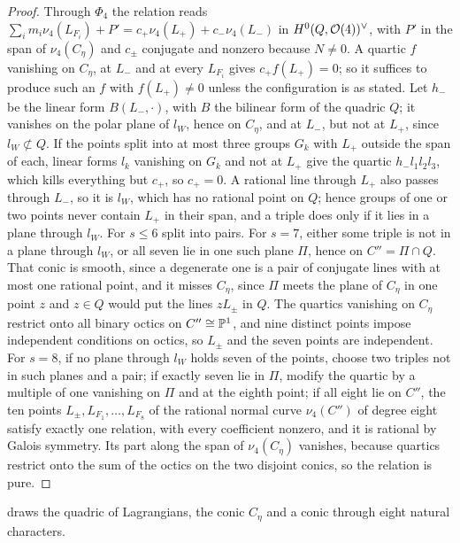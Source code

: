 \begin{proof}
Through $\Phi_{4}$ the relation reads
$\sum_{i}m_{i}\nu_{4}(L_{F_{i}})+P'=c_{+}\nu_{4}(L_{+})+c_{-}\nu_{4}(L_{-})$ in
$H^{0}(Q,\mathcal{O}(4))^{\vee}$, with $P'$ in the span of $\nu_{4}(C_{\eta})$ and
$c_{\pm}$ conjugate and nonzero because $N\ne0$. A quartic $f$ vanishing on
$C_{\eta}$, at $L_{-}$ and at every $L_{F_{i}}$ gives $c_{+}f(L_{+})=0$; so it
suffices to produce such an $f$ with $f(L_{+})\ne0$ unless the configuration
is as stated. Let $h_{-}$ be the linear form $B(L_{-},\cdot)$, with $B$ the
bilinear form of the quadric $Q$; it vanishes on the polar plane of $l_{W}$,
hence on $C_{\eta}$, and at $L_{-}$, but not at $L_{+}$, since
$l_{W}\not\subset Q$. If the points split into at most three groups
$G_{k}$ with $L_{+}$ outside the span of each, linear forms $l_{k}$ vanishing
on $G_{k}$ and not at $L_{+}$ give the quartic $h_{-}l_{1}l_{2}l_{3}$, which
kills everything but $c_{+}$, so $c_{+}=0$. A rational line through $L_{+}$
also passes through $L_{-}$, so it is $l_{W}$, which has no rational point on
$Q$; hence groups of one or two points
never contain $L_{+}$ in their span, and a triple does only if it lies in a
plane through $l_{W}$. For $s\le6$ split into pairs. For $s=7$, either some
triple is not in a plane through $l_{W}$, or all seven lie in one such plane
$\Pi$, hence on $C''=\Pi\cap Q$. That conic is smooth, since a degenerate one
is a pair of conjugate lines with at most one rational point, and it misses
$C_{\eta}$, since $\Pi$ meets the plane of $C_{\eta}$ in one point $z$ and
$z\in Q$ would put the lines $zL_{\pm}$ in $Q$. The quartics vanishing on
$C_{\eta}$ restrict onto all binary octics on $C''\cong\mathbb{P}^{1}$, and nine
distinct points impose independent conditions on octics, so $L_{\pm}$ and the
seven points are independent. For $s=8$, if no plane through $l_{W}$ holds
seven of the points, choose two triples not in such planes and a pair; if
exactly seven lie in $\Pi$, modify the quartic by a multiple of one vanishing
on $\Pi$ and at the eighth point; if all eight lie on $C''$, the ten points
$L_{\pm},L_{F_{1}},\dots,L_{F_{8}}$ of the rational normal curve
$\nu_{4}(C'')$ of degree eight satisfy exactly one relation, with every
coefficient nonzero, and it is rational by Galois symmetry. Its part along the
span of $\nu_{4}(C_{\eta})$ vanishes, because quartics restrict onto the sum of
the octics on the two disjoint conics, so the relation is pure.
\end{proof}

 draws the quadric of Lagrangians, the conic
$C_{\eta}$ and a conic through eight natural characters.

